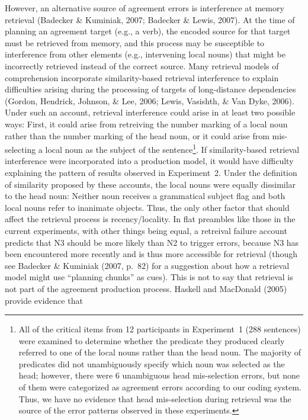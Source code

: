 \documentclass[12pt,titlepage]{article}
\begin{document}
{However, an alternative source of agreement errors is interference at
memory retrieval (Badecker \& Kuminiak, 2007; Badecker \& Lewis, 2007).  At
the time of planning an agreement target (e.g., a verb), the encoded source
for that target must be retrieved from memory, and this process may be
susceptible to interference from other elements (e.g., intervening local
nouns) that might be incorrectly retrieved instead of the correct source.
Many retrieval models of comprehension incorporate similarity-based
retrieval interference to explain difficulties arising during the
processing of targets of long-distance dependencies (Gordon, Hendrick,
Johnson, \& Lee, 2006; Lewis, Vasishth, \& Van Dyke, 2006).  Under such an
account, retrieval interference could arise in at least two possible ways:
First, it could arise from retreiving the number marking of a local noun
rather than the number marking of the head noun, or it could arise from
mis-selecting a local noun as the subject of the sentence\footnote{All of
the critical items from 12 participants in Experiment~1 (288 sentences)
were examined to determine whether the predicate they produced clearly
referred to one of the local nouns rather than the head noun.  The majority
of predicates did not unambiguously specify which noun was selected as the
head; however, there were 6 unambiguous head mis-selection errors, but none
of them were categorized as agreement errors according to our coding
system.  Thus, we have no evidence that head mis-selection during retrieval
was the source of the error patterns observed in these experiments.}.  If
similarity-based retrieval interference were incorporated into a production
model, it would have difficulty explaining the pattern of results observed
in Experiment~2.  Under the definition of similarity proposed by these
accounts, the local nouns were equally dissimilar to the head noun: Neither
noun receives a grammatical subject flag and both local nouns refer to
inanimate objects.  Thus, the only other factor that should affect the
retrieval process is recency/locality.  In flat preambles like those in the
current experiments, with other things being equal, a retreival failure
account predicts that N3 should be more likely than N2 to trigger errors,
because N3 has been encountered more recently and is thus more accessible
for retrieval (though see Badecker \& Kuminiak (2007, p.~82) for a
suggestion about how a retrieval model might use ``planning chunks'' as
cues).  This is not to say that retrieval is not part of the agreement
production process.  Haskell and MacDonald (2005) provide evidence that
}
\end{document}

